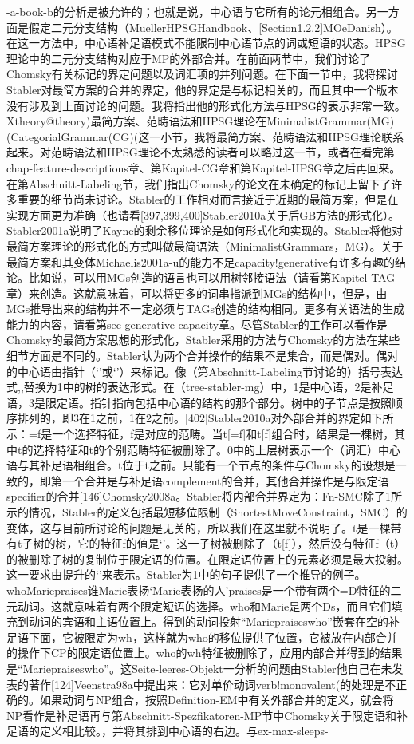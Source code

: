 -a-book-b的分析是被允许的；也就是说，中心语与它所有的论元相组合。另一方面是假定二元分支结构（MuellerHPSGHandbook、[Section1.2.2]MOeDanish）。在这一方法中，中心语补足语模式不能限制中心语节点的词或短语的状态。HPSG理论中的二元分支结构对应于MP的外部合并。在前面两节中，我们讨论了Chomsky有关标记的界定问题以及词汇项的并列问题。在下面一节中，我将探讨Stabler对最简方案的合并的界定，他的界定是与标记相关的，而且其中一个版本没有涉及到上面讨论的问题。我将指出他的形式化方法与HPSG的表示非常一致。Xtheory@theory)最简方案、范畴语法和HPSG理论在MinimalistGrammar(MG)(CategorialGrammar(CG)(这一小节，我将最简方案、范畴语法和HPSG理论联系起来。对范畴语法和HPSG理论不太熟悉的读者可以略过这一节，或者在看完第chap-feature-descriptions章、第Kapitel-CG章和第Kapitel-HPSG章之后再回来。在第Abschnitt-Labeling节，我们指出Chomsky的论文在未确定的标记上留下了许多重要的细节尚未讨论。Stabler的工作相对而言接近于近期的最简方案，但是在实现方面更为准确（也请看[397,399,400]Stabler2010a关于后GB方法的形式化）。Stabler2001a说明了Kayne的剩余移位理论是如何形式化和实现的。Stabler将他对最简方案理论的形式化的方式叫做最简语法（MinimalistGrammars，MG）。关于最简方案和其变体Michaelis2001a-u的能力不足capacity!generative有许多有趣的结论。比如说，可以用MGs创造的语言也可以用树邻接语法（请看第Kapitel-TAG章）来创造。这就意味着，可以将更多的词串指派到MGs的结构中，但是，由MGs推导出来的结构并不一定必须与TAGs创造的结构相同。更多有关语法的生成能力的内容，请看第sec-generative-capacity章。尽管Stabler的工作可以看作是Chomsky的最简方案思想的形式化，Stabler采用的方法与Chomsky的方法在某些细节方面是不同的。Stabler认为两个合并操作的结果不是集合，而是偶对。偶对的中心语由指针（`'或`'）来标记。像（第Abschnitt-Labeling节讨论的）括号表达式,,替换为1中的树的表达形式。在（tree-stabler-mg）中，1是中心语，2是补足语，3是限定语。指针指向包括中心语的结构的那个部分。树中的子节点是按照顺序排列的，即3在1之前，1在2之前。[402]Stabler2010a对外部合并的界定如下所示：=f是一个选择特征，f是对应的范畴。当t[=f]和t[f]组合时，结果是一棵树，其中t的选择特征和t的个别范畴特征被删除了。0中的上层树表示一个（词汇）中心语与其补足语相组合。t位于t之前。只能有一个节点的条件与Chomsky的设想是一致的，即第一个合并是与补足语complement的合并，其他合并操作是与限定语specifier的合并[146]Chomsky2008a。Stabler将内部合并界定为：Fn-SMC除了1所示的情况，Stabler的定义包括最短移位限制（ShortestMoveConstraint，SMC）的变体，这与目前所讨论的问题是无关的，所以我们在这里就不说明了。t是一棵带有t子树的树，它的特征f的值是`'。这一子树被删除了（t[f]），然后没有特征f（t）的被删除子树的复制位于限定语的位置。在限定语位置上的元素必须是最大投射。这一要求由提升的`'来表示。Stabler为1中的句子提供了一个推导的例子。whoMariepraises谁Marie表扬`Marie表扬的人'praises是一个带有两个=D特征的二元动词。这就意味着有两个限定短语的选择。who和Marie是两个Ds，而且它们填充到动词的宾语和主语位置上。得到的动词投射“Mariepraiseswho”嵌套在空的补足语下面，它被限定为wh，这样就为who的移位提供了位置，它被放在内部合并的操作下CP的限定语位置上。who的wh特征被删除了，应用内部合并得到的结果是“Mariepraiseswho”。这Seite-leeres-Objekt一分析的问题由Stabler他自己在未发表的著作[124]Veenstra98a中提出来：它对单价动词verb!monovalent(的处理是不正确的。如果动词与NP组合，按照Definition-EM中有关外部合并的定义，就会将NP看作是补足语再与第Abschnitt-Spezfikatoren-MP节中Chomsky关于限定语和补足语的定义相比较。，并将其排到中心语的右边。与ex-max-sleeps-